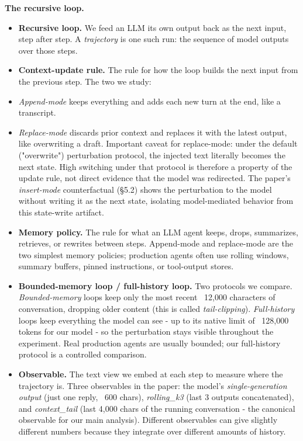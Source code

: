 \documentclass{article}
\theoremstyle{plain}
\theoremstyle{definition}
\begin{document}
\textbf{The recursive loop.}

\begin{itemize}
  \item \textbf{Recursive loop.} We feed an LLM its own output back as the next
  input, step after step. A \textit{trajectory} is one such run: the
  sequence of model outputs over those steps.
  \item \textbf{Context-update rule.} The rule for how the loop builds the
  next input from the previous step. The two we study:
  \item \textit{Append-mode} keeps everything and adds each new turn at the
    end, like a transcript.
  \item \textit{Replace-mode} discards prior context and replaces it with the
    latest output, like overwriting a draft.
  Important caveat for replace-mode: under the default ("overwrite")
  perturbation protocol, the injected text literally becomes the
  next state. High switching under that protocol is therefore a
  property of the update rule, not direct evidence that the model
  was redirected. The paper's \textit{insert-mode} counterfactual (§5.2)
  shows the perturbation to the model without writing it as the
  next state, isolating model-mediated behavior from this
  state-write artifact.
  \item \textbf{Memory policy.} The rule for what an LLM agent keeps, drops,
  summarizes, retrieves, or rewrites between steps. Append-mode
  and replace-mode are the two simplest memory policies; production
  agents often use rolling windows, summary buffers, pinned
  instructions, or tool-output stores.
  \item \textbf{Bounded-memory loop / full-history loop.} Two protocols we
  compare. \textit{Bounded-memory} loops keep only the most recent
  ~12,000 characters of conversation, dropping older content (this
  is called \textit{tail-clipping}). \textit{Full-history} loops keep everything
  the model can see - up to its native limit of ~128,000 tokens
  for our model - so the perturbation stays visible throughout the
  experiment. Real production agents are usually bounded; our
  full-history protocol is a controlled comparison.
  \item \textbf{Observable.} The text view we embed at each step to measure
  where the trajectory is. Three observables in the paper: the
  model's \textit{single-generation output} (just one reply, ~600 chars),
  \textit{rolling\_k3} (last 3 outputs concatenated), and \textit{context\_tail}
  (last 4,000 chars of the running conversation - the canonical
  observable for our main analysis). Different observables can give
  slightly different numbers because they integrate over different
  amounts of history.
\end{itemize}
\end{document}
